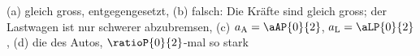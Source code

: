 (a) gleich gross, entgegengesetzt, (b) falsch: Die Kräfte sind gleich gross; der Lastwagen ist nur schwerer abzubremsen, (c) $a_\mathrm{A} = \aAP{0}{2}$, $a_\mathrm{L} = \aLP{0}{2}$, (d) die des Autos, $\ratioP{0}{2}$-mal so stark
